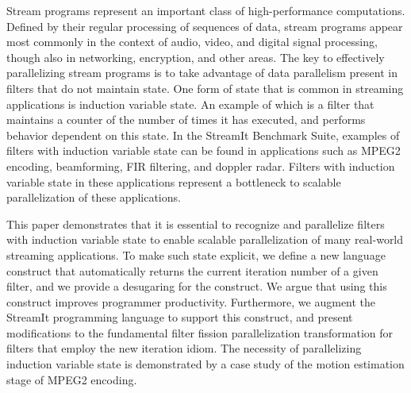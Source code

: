 Stream programs represent an important class of high-performance
computations. Deﬁned by their regular processing of sequences of data,
stream programs appear most commonly in the context of audio, video,
and digital signal processing, though also in networking, encryption,
and other areas. The key to effectively parallelizing stream programs
is to take advantage of data parallelism present in filters that do
not maintain state.  One form of state that is common in streaming
applications is induction variable state.  An example of which is a
filter that maintains a counter of the number of times it has
executed, and performs behavior dependent on this state.  In the
StreamIt Benchmark Suite, examples of filters with induction variable
state can be found in applications such as MPEG2 encoding,
beamforming, FIR filtering, and doppler radar.  Filters with induction
variable state in these applications represent a bottleneck to
scalable parallelization of these applications.

This paper demonstrates that it is essential to recognize and
parallelize filters with induction variable state to enable scalable
parallelization of many real-world streaming applications.  To make
such state explicit, we define a new language construct that
automatically returns the current iteration number of a given filter,
and we provide a desugaring for the construct.  We argue that using this
construct improves programmer productivity.  Furthermore, we augment
the StreamIt programming language to support this construct, and
present modifications to the fundamental filter fission
parallelization transformation for filters that employ the new
iteration idiom.  The necessity of parallelizing induction variable
state is demonstrated by a case study of the motion estimation stage
of MPEG2 encoding.



